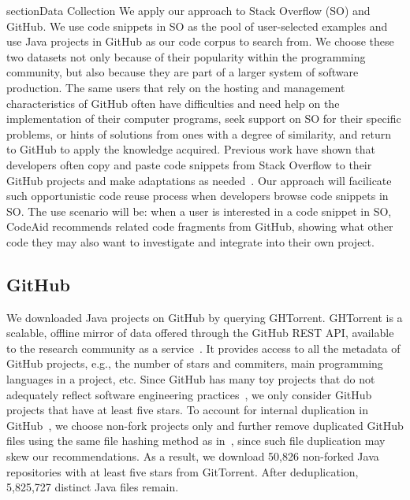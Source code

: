 section{Data Collection}
\label{sec:dataset}
We apply our approach to Stack Overflow (SO) and GitHub. We use code snippets in SO as the pool of user-selected examples and use Java projects in GitHub as our code corpus to search from. We choose these two datasets not only because of their popularity within the programming community, but also because they are part of a larger system of software production. The same users that rely on the hosting and management characteristics of GitHub often have difficulties and need help on the implementation of their computer programs, seek support on SO for their specific problems, or hints of solutions from ones with a degree of similarity, and return to GitHub to apply the knowledge acquired. Previous work have shown that developers often copy and paste code snippets from Stack Overflow to their GitHub projects and make adaptations as needed~\cite{yang2017stack, an2017stack, wu2018developers, zhang2019analyzing}. Our approach will facilicate such opportunistic code reuse process when developers browse code snippets in SO. The use scenario will be: when a user is interested in a code snippet in SO, CodeAid recommends related code fragments from GitHub, showing what other code they may also want to investigate and integrate into their own project. 


\subsection{GitHub}
We downloaded Java projects on GitHub by querying GHTorrent. GHTorrent is a scalable, offline mirror of data offered through the GitHub REST API, available to the research community as a service~\cite{gousios2012ghtorrent}. It provides access to all the metadata of GitHub projects, e.g., the number of stars and commiters, main programming languages in a project, etc. Since GitHub has many toy projects that do not adequately reflect software engineering practices~\cite{kalliamvakou2014promises}, we only consider GitHub projects that have at least five stars. To account for internal duplication in GitHub~\cite{lopes2017dejavu}, we choose non-fork projects only and further remove duplicated GitHub files using the same file hashing method as in~\cite{lopes2017dejavu}, since such file duplication may skew our recommendations. As a result, we download 50,826 non-forked Java repositories with at least five stars from GitTorrent. After deduplication, 5,825,727 distinct Java files remain.



